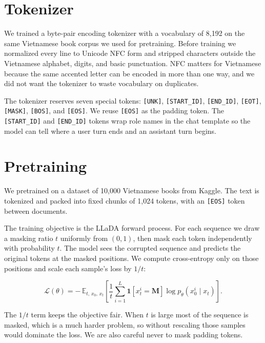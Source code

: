 \documentclass{llncs}
\begin{document}
\section{Tokenizer}

We trained a byte-pair encoding tokenizer with a vocabulary of 8{,}192 on the same Vietnamese
book corpus we used for pretraining. Before training we normalized every line to Unicode NFC
form and stripped characters outside the Vietnamese alphabet, digits, and basic punctuation.
NFC matters for Vietnamese because the same accented letter can be encoded in more than one way,
and we did not want the tokenizer to waste vocabulary on duplicates.

The tokenizer reserves seven special tokens: \texttt{[UNK]}, \texttt{[START\_ID]},
\texttt{[END\_ID]}, \texttt{[EOT]}, \texttt{[MASK]}, \texttt{[BOS]}, and \texttt{[EOS]}. We
reuse \texttt{[EOS]} as the padding token. The \texttt{[START\_ID]} and \texttt{[END\_ID]}
tokens wrap role names in the chat template so the model can tell where a user turn ends and an
assistant turn begins.

\section{Pretraining}

We pretrained on a dataset of 10{,}000 Vietnamese books from Kaggle. The text is tokenized and
packed into fixed chunks of 1{,}024 tokens, with an \texttt{[EOS]} token between documents.

The training objective is the LLaDA forward process. For each sequence we draw a masking ratio
$t$ uniformly from $(0, 1)$, then mask each token independently with probability $t$. The model
sees the corrupted sequence and predicts the original tokens at the masked positions. We compute
cross-entropy only on those positions and scale each sample's loss by $1/t$:

\begin{equation}
\mathcal{L}(\theta) = -\,\mathbb{E}_{t,\,x_0,\,x_t}
\left[ \frac{1}{t} \sum_{i=1}^{L} \mathbf{1}\!\left[x_t^i = \mathbf{M}\right]
\log p_\theta\!\left(x_0^i \mid x_t\right) \right].
\end{equation}

The $1/t$ term keeps the objective fair. When $t$ is large most of the sequence is masked, which
is a much harder problem, so without rescaling those samples would dominate the loss. We are also
careful never to mask padding tokens.
\end{document}
